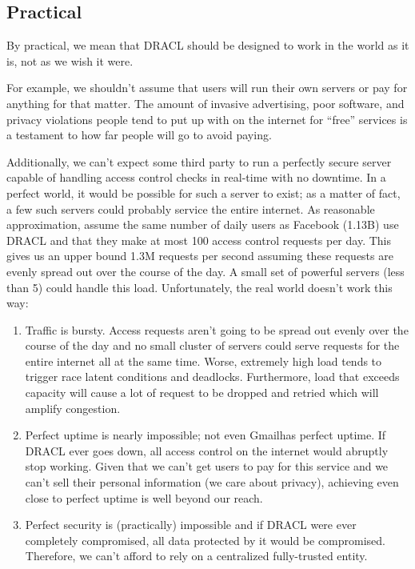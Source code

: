 \documentclass[pdftex,12pt,a4papaer]{report}
\begin{document}
\subsection{Practical}

By practical, we mean that DRACL should be designed to work in the world as it
is, not as we wish it were.

For example, we shouldn't assume that users will run their own servers or pay
for anything for that matter. The amount of invasive advertising, poor software,
and privacy violations people tend to put up with on the internet for ``free''
services is a testament to how far people will go to avoid paying.

Additionally, we can't expect some third party to run a perfectly secure server
capable of handling access control checks in real-time with no downtime. In a
perfect world, it would be possible for such a server to exist; as a matter of
fact, a few such servers could probably service the entire internet. As
reasonable approximation, assume the same number of daily users as
Facebook\texttrademark{} (1.13B) use DRACL and that they make at most 100 access
control requests per day. This gives us an upper bound 1.3M requests per second
assuming these requests are evenly spread out over the course of the day. A
small set of powerful servers (less than 5) could handle this load. 
Unfortunately, the real world doesn't work this way:

\begin{enumerate}
\item Traffic is bursty. Access requests aren't going to be spread out evenly
  over the course of the day and no small cluster of servers could serve requests
  for the entire internet all at the same time. Worse, extremely high load tends
  to trigger race latent conditions and deadlocks. Furthermore, load that
  exceeds capacity will cause a lot of request to be dropped and retried which
  will amplify congestion.
\item Perfect uptime is nearly impossible; not even Gmail\texttrademark has
  perfect uptime. If DRACL ever goes down, all access control on the internet
  would abruptly stop working. Given that we can't get users to pay for this
  service and we can't sell their personal information (we care about privacy),
  achieving even close to perfect uptime is well beyond our reach.
\item Perfect security is (practically) impossible and if DRACL were ever
  completely compromised, all data protected by it would be compromised. Therefore, we can't afford to rely on a
  centralized fully-trusted entity.
\end{enumerate}
\end{document}

